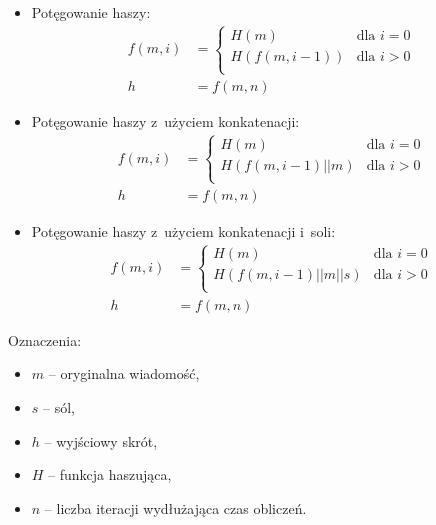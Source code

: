 \begin{itemize}
    \item Potęgowanie haszy:
    \[
        \begin{aligned}
        f(m, i) &=
            \begin{cases}
                H(m) & \mbox{dla } i = 0 \\
                H(f(m, i - 1)) & \mbox{dla } i > 0 \\
            \end{cases}
        \\
        h &= f(m, n)
        \end{aligned}
    \]

    \item Potęgowanie haszy z~użyciem konkatenacji:
    \[
        \begin{aligned}
        f(m, i) &=
            \begin{cases}
                H(m) & \mbox{dla } i = 0 \\
                H(f(m, i - 1) || m) & \mbox{dla } i > 0 \\
            \end{cases}
        \\
        h &= f(m, n)
        \end{aligned}
    \]

    \item Potęgowanie haszy z~użyciem konkatenacji i~soli:
    \[
        \begin{aligned}
        f(m, i) &=
            \begin{cases}
                H(m) & \mbox{dla } i = 0 \\
                H(f(m, i - 1) || m || s) & \mbox{dla } i > 0 \\
            \end{cases}
        \\
        h &= f(m, n)
        \end{aligned}
    \]

\end{itemize}

Oznaczenia:
\begin{itemize}
    \item $m$ -- oryginalna wiadomość,
    \item $s$ -- sól,
    \item $h$ -- wyjściowy skrót,
    \item $H$ -- funkcja haszująca,
    \item $n$ -- liczba iteracji wydłużająca czas obliczeń.
\end{itemize}

